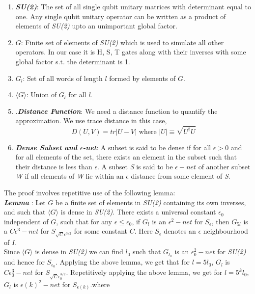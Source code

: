 \begin{enumerate}
\item \textbf{\textit{SU(2)}}: The set of all single qubit unitary matrices with determinant equal to one. Any single qubit unitary operator can be written as a product of elements of \textit{SU(2)} upto an unimportant global factor.
\item \textbf{$G$}: Finite set of elements of \textit{SU(2)} which is used to simulate all other operators. In our case it is H, S, T gates along with their inverses with some global factor s.t. the determinant is 1.
\item \textbf{${G_l}$}: Set of all words of length ${l}$ formed by elements of ${G}$.
\item $\langle G \rangle$: Union of \textit{$G_l$} for all \textit{l}.
\item .\textbf{\textit{Distance Function}}: We need a distance function to quantify the approximation. We use trace distance in this case,\begin{equation}
 D(U,V) = tr|U-V| \text{ where } |U| \equiv \sqrt{U^\dagger U}
 \end{equation}
\item \textbf{\textit{Dense Subset and $\epsilon$-net}}: A subset is said to be dense if for all $\epsilon>0$  and for all elements of the set, there exists an element in the subset such that their distance is less than $\epsilon$. A subset \textit{S} is said to be $\epsilon-net$ of another subset \textit{W} if all elements of \textit{W} lie within an $\epsilon$ distance from some element of \textit{S}. 
\end{enumerate}
The proof involves repetitive use of the following lemma:\\
\textbf{\textit{Lemma}} : Let $G$ be a finite set of elements in \textit{SU(2)} containing its own inverses, and such that $\langle G \rangle$ is dense in \textit{SU(2)}. There exists a universal constant $\epsilon_0$ independent of $G$, such that for any $\epsilon \leq \epsilon_0$, if $G_l$ is an $\epsilon^2-net$ for $S_\epsilon$, then $G_{5l}$ is a $C \epsilon^3 -net$ for $S_{\sqrt{C}\epsilon^{3/2}}$ for some constant $C$. Here $S_\epsilon$ denotes an $\epsilon$ neighbourhood of $I$.\\
Since $\langle G \rangle$ is dense in \textit{SU(2)} we can find $l_0$ such that $G_{l_0}$ is an $\epsilon_0^2 - net$ for \textit{SU(2)} and hence for $S_{\epsilon_0}$. Applying the above lemma, we get that for $l= 5l_0$, $G_l$ is $C\epsilon_0^3-net$ for $S_{\sqrt{C}\epsilon_0^{3/2}}$. Repetitively applying the above lemma, we get for $l = 5^k l_0$, $G_l$ is $\epsilon(k)^2-net$ for $S_{\epsilon(k)}$.where

